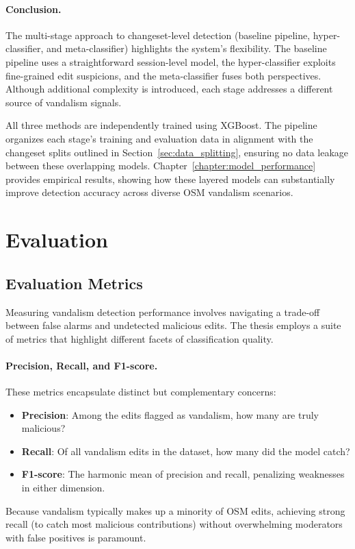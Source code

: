 \documentclass[
    13pt, %
    a4paper, %
    DIV14, %
    listof=totoc, %
    bibliography=totoc, %
    index=totoc, %
    headsepline
]{scrreprt}
\begin{document}
\paragraph{Conclusion.}

The multi-stage approach to changeset-level detection (baseline pipeline, hyper-classifier, and meta-classifier) highlights the system’s flexibility. The baseline pipeline uses a straightforward session-level model, the hyper-classifier exploits fine-grained edit suspicions, and the meta-classifier fuses both perspectives. Although additional complexity is introduced, each stage addresses a different source of vandalism signals.

All three methods are independently trained using XGBoost. The pipeline organizes each stage’s training and evaluation data in alignment with the changeset splits outlined in Section~\ref{sec:data_splitting}, ensuring no data leakage between these overlapping models. Chapter~\ref{chapter:model_performance} provides empirical results, showing how these layered models can substantially improve detection accuracy across diverse OSM vandalism scenarios.


\section{Evaluation}
\label{sec:evaluation}

\subsection{Evaluation Metrics}
\label{sec:evaluation_metrics}

Measuring vandalism detection performance involves navigating a trade-off between false alarms and undetected malicious edits. The thesis employs a suite of metrics that highlight different facets of classification quality.

\paragraph{Precision, Recall, and F1-score.}
These metrics encapsulate distinct but complementary concerns:
\begin{itemize}
    \item \textbf{Precision}: Among the edits flagged as vandalism, how many are truly malicious?
    \item \textbf{Recall}: Of all vandalism edits in the dataset, how many did the model catch?
    \item \textbf{F1-score}: The harmonic mean of precision and recall, penalizing weaknesses in either dimension.
\end{itemize}
Because vandalism typically makes up a minority of OSM edits, achieving strong recall (to catch most malicious contributions) without overwhelming moderators with false positives is paramount.
\end{document}
